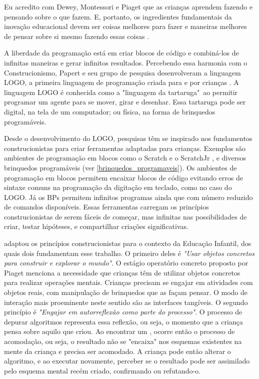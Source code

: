 \begin{citacao}
Eu acredito com Dewey, Montessori e Piaget que as crianças aprendem fazendo e pensando sobre o que fazem. E, portanto, os ingredientes fundamentais da inovação educacional devem ser coisas melhores para fazer e maneiras melhores de pensar sobre si mesmo fazendo essas coisas \cite[p.3, tradução nossa]{papert_teaching_1972}.
\end{citacao}

A liberdade da programação está em criar blocos de código e combiná-los de infinitas maneiras e gerar infinitos resultados. Percebendo essa harmonia com o Construcionismo, Papert e seu grupo de pesquisa desenvolveram a linguagem LOGO, a primeira linguagem de programação criada para e por crianças \cite{solomon_history_2020}. A linguagem LOGO é conhecida como a "linguagem da tartaruga"\ ao permitir programar um agente para se mover, girar e desenhar. Essa tartaruga pode ser digital, na tela de um computador; ou física, na forma de brinquedos programáveis.

Desde o desenvolvimento do LOGO, pesquisas têm se inspirado nos fundamentos construcionistas para criar ferramentas adaptadas para crianças. Exemplos são ambientes de programação em blocos como o Scratch e o ScratchJr \cite{flannery_designing_2013}, e diversos brinquedos programáveis (ver \autoref{brinquedos_programaveis}). Os ambientes de programação em blocos permitem encaixar blocos de código evitando erros de sintaxe comuns na programação da digitação em teclado, como no caso do LOGO. Já os BPs permitem infinitos programas ainda que com número reduzido de comandos disponíveis. Essas ferramentas carregam os princípios construcionistas de serem fáceis de começar, mas infinitas nas possibilidades de criar, testar hipóteses, e compartilhar criações significativas.

 adaptou os princípios construcionistas para o contexto da Educação Infantil, dos quais dois fundamentam esse trabalho. O primeiro deles é \textit{"Usar objetos concretos para construir e explorar o mundo"}. O estágio operatório concreto proposto por Piaget menciona a necessidade que crianças têm de utilizar objetos concretos para realizar operações mentais. Crianças precisam se engajar em atividades com objetos reais, com manipulação de brinquedos que as façam pensar. O modo de interação mais proeminente neste sentido são as interfaces tangíveis. O segundo princípio é \textit{"Engajar em autorreflexão como parte do processo"}. O processo de depurar algoritmos representa essa reflexão, ou seja, o momento que a criança pensa sobre aquilo que criou. Ao encontrar um \bug, ocorre então o processo de acomodação, ou seja, o resultado não se "encaixa" nos esquemas existentes na mente da criança e precisa ser acomodado. A criança pode então alterar o algoritmo, e ao executar novamente, perceber se o resultado pode ser assimilado pelo esquema mental recém criado, confirmando ou refutando-o.
    
